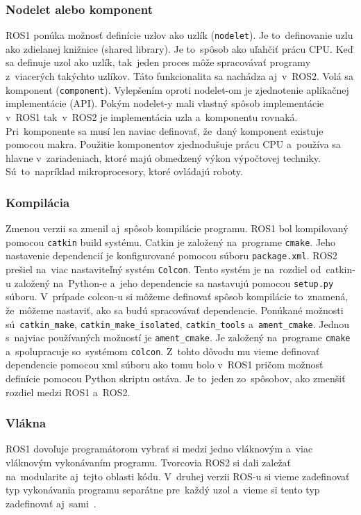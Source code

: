 \subsubsection{Nodelet alebo komponent}

	ROS1 ponúka možnosť definície uzlov ako uzlík (\texttt{nodelet}). Je to~definovanie uzlu ako zdielanej knižnice (shared library). Je
	to~spôsob ako uľahčiť prácu CPU. Keď sa definuje uzol ako uzlík, tak~jeden proces môže spracovávať programy z~viacerých takýchto uzlíkov.
	Táto funkcionalita sa nachádza aj~v~ROS2. Volá sa komponent (\texttt{component}). Vylepšením oproti nodelet-om je zjednotenie aplikačnej
	implementácie (API). Pokým nodelet-y mali vlastný spôsob implementácie v~ROS1 tak~v~ROS2 je implementácia uzla a~komponentu rovnaká.
	Pri~komponente sa musí len naviac definovať, že~daný komponent existuje pomocou makra. Použitie komponentov zjednodušuje prácu CPU
	a~používa sa hlavne v~zariadeniach, ktoré majú obmedzený výkon výpočtovej techniky. Sú~to~napríklad mikroprocesory, ktoré ovládajú roboty.

\subsubsection{Kompilácia}

	Zmenou verzii sa zmenil aj~spôsob kompilácie programu. ROS1 bol kompilovaný pomocou \texttt{catkin} build systému. Catkin je založený
	na~programe \texttt{cmake}. Jeho nastavenie dependencií je konfigurované pomocou súboru \texttt{package.xml}. ROS2 prešiel na~viac
	nastaviteľný systém \texttt{Colcon}. Tento systém je na~rozdiel od~catkin-u založený na~Python-e a~jeho dependencie sa nastavujú pomocou
	\texttt{setup.py} súboru. V~prípade colcon-u si môžeme definovať spôsob kompilácie to~znamená, že~môžeme nastaviť, ako sa budú spracovávať
	dependencie. Ponúkané možnosti sú~\texttt{catkin\_make}, \texttt{catkin\_make\_isolated}, \texttt{catkin\_tools} a~\texttt{ament\_cmake}.
	Jednou s~najviac používaných možností je \texttt{ament\_cmake}. Je založený na~programe \texttt{cmake} a~spolupracuje so~systémom \texttt{colcon}.
	Z~tohto dôvodu mu vieme definovať dependencie pomocou xml súboru ako tomu bolo v~ROS1 pričom možnosť definície pomocou Python skriptu ostáva.
	Je to~jeden zo~spôsobov, ako zmenšiť rozdiel medzi ROS1 a~ROS2.

\subsubsection{Vlákna}

	ROS1 dovoľuje programátorom vybrať si medzi jedno vláknovým a~viac vláknovým vykonávaním programu. Tvorcovia ROS2 si dali zaležať na~modularite
	aj~tejto oblasti kódu. V~druhej verzii ROS-u si vieme zadefinovať typ vykonávania programu separátne pre~každý uzol a~vieme si tento typ
	zadefinovať aj~sami~\cite{ROS2design}.


